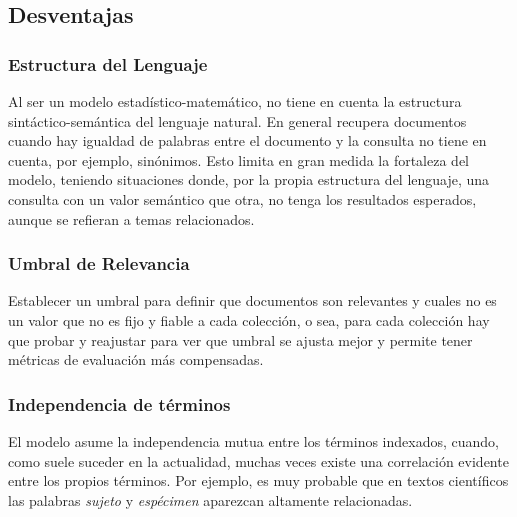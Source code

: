 \subsection{Desventajas}

\subsubsection{Estructura del Lenguaje}

Al ser un modelo estadístico-matemático, no tiene en cuenta la estructura
sintáctico-semántica del lenguaje natural. En general recupera documentos
cuando hay igualdad de palabras entre el documento y la consulta no tiene en
cuenta, por ejemplo, sinónimos. Esto limita en gran medida la fortaleza del
modelo, teniendo situaciones donde, por la propia estructura del lenguaje, una
consulta con un valor semántico que otra, no tenga los resultados esperados,
aunque se refieran a temas relacionados.

\subsubsection{Umbral de Relevancia}

Establecer un umbral para definir que documentos son relevantes y cuales no es
un valor que no es fijo y fiable a cada colección, o sea, para cada colección
hay que probar y reajustar para ver que umbral se ajusta mejor y permite tener
métricas de evaluación más compensadas.

\subsubsection{Independencia de términos}

El modelo asume la independencia mutua entre los términos indexados, cuando,
como suele suceder en la actualidad, muchas veces existe una correlación
evidente entre los propios términos. Por ejemplo, es muy probable que en
textos científicos las palabras \emph{sujeto} y \emph{espécimen} aparezcan
altamente relacionadas.

